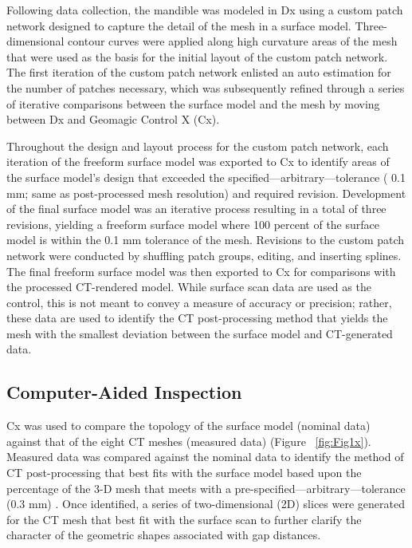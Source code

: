 \documentclass[review]{elsarticle}
\begin{document}
Following data collection, the mandible was modeled in Dx using a custom patch network designed to capture the detail of the mesh in a surface model. Three-dimensional contour curves were applied along high curvature areas of the mesh that were used as the basis for the initial layout of the custom patch network. The first iteration of the custom patch network enlisted an auto estimation for the number of patches necessary, which was subsequently refined through a series of iterative comparisons between the surface model and the mesh by moving between Dx and Geomagic Control X (Cx).

Throughout the design and layout process for the custom patch network, each iteration of the freeform surface model was exported to Cx to identify areas of the surface model’s design that exceeded the specified---arbitrary---tolerance ( 0.1 mm; same as post-processed mesh resolution) and required revision. Development of the final surface model was an iterative process resulting in a total of three revisions, yielding a freeform surface model where 100 percent of the surface model is within the  0.1 mm tolerance of the mesh. Revisions to the custom patch network were conducted by shuffling patch groups, editing, and inserting splines. The final freeform surface model was then exported to Cx for comparisons with the processed CT-rendered model. While surface scan data are used as the control, this is not meant to convey a measure of accuracy or precision; rather, these data are used to identify the CT post-processing method that yields the mesh with the smallest deviation between the surface model and CT-generated data.

\subsection{Computer-Aided Inspection}

Cx was used to compare the topology of the surface model (nominal data) against that of the eight CT meshes (measured data) \citep{RN11473,sj2021} (Figure ~\ref{fig:Fig1x}). Measured data was compared against the nominal data \citep{RN11463,RN5923,RN11460,RN11465} to identify the method of CT post-processing that best fits with the surface model based upon the percentage of the 3-D mesh that meets with a pre-specified---arbitrary---tolerance (0.3 mm) \citep{RN5925,RN11471,RN11455}. Once identified, a series of two-dimensional (2D) slices were generated for the CT mesh that best fit with the surface scan to further clarify the character of the geometric shapes associated with gap distances.
\end{document}
